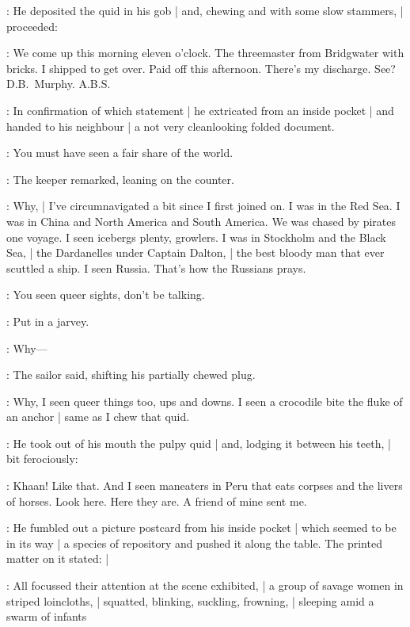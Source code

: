 :
He deposited the quid in his gob |
and, chewing and with some slow stammers, |
proceeded:

\Murphy:
We come up this morning eleven o'clock.
The threemaster  from Bridgwater with bricks.
I shipped to get over.
Paid off this afternoon.
There's my discharge.
See?
D.B.~Murphy. A.B.S.

:
In confirmation of which statement |
he extricated from an inside pocket |
and handed to his neighbour |
a not very cleanlooking folded document.

\SkinTheGoat:
You must have seen a fair share of the world.

:
The keeper remarked, leaning on the counter.

\Murphy:
Why, |
I've circumnavigated a bit since I first joined on.
I was in the Red Sea.
I was in China and North America and South America.
We was chased by pirates one voyage.
I seen icebergs plenty, growlers.
I was in Stockholm and the Black Sea, |
the Dardanelles under Captain Dalton, |
the best bloody man that ever scuttled a ship.
I seen Russia.
That's how the Russians prays.

\Campbell:
You seen queer sights, don't be talking.

:
Put in a jarvey.

\Murphy:
Why---

:
The sailor said, shifting his partially chewed plug.

\Murphy:
Why, I seen queer things too, ups and downs.
I seen a crocodile bite the fluke of an anchor |
same as I chew that quid.

:
He took out of his mouth the pulpy quid |
and, lodging it between his teeth, |
bit ferociously:

\Murphy:
Khaan! Like that.
And I seen maneaters in Peru that eats corpses and the livers of horses.
Look here.
Here they are. A friend of mine sent me.

:
He fumbled out a picture postcard from his inside pocket |
which seemed to be in its way |
a species of repository and pushed it along the table.
The printed matter on it stated: |

:
All focussed their attention at the scene exhibited, |
a group of savage women in striped loincloths, |
squatted, blinking, suckling, frowning, |
sleeping amid a swarm of infants


